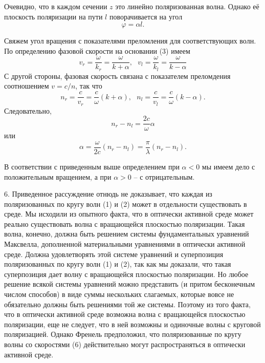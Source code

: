\documentclass[14pt]{article}
\begin{document}
Очевидно, что в каждом сечении $z$ это линейно поляризованная волна. Однако её плоскость поляризации на пути $l$ поворачивается на угол
\begin{equation}
	\varphi = \alpha l.
\end{equation}

Свяжем угол вращения с показателями преломления для соответствующих волн. По определению фазовой скорости на основании (3) имеем
\begin{equation}
	v_r = \frac{\omega}{k_r} = \frac{\omega}{k + \alpha},~~~v_l = \frac{\omega}{k_l} = \frac{\omega}{k - \alpha}
\end{equation}
С другой стороны, фазовая скорость связана с показателем преломдения соотношением $v = c/n$, так что
\begin{equation}
	n_r = \frac{c}{v_r} = \frac{c}{\omega}(k + \alpha),~~~n_l = \frac{c}{v_l} = \frac{c}{\omega}(k - \alpha).
\end{equation}
Следовательно,
\begin{equation}
	n_r - n_l = \frac{2c}{\omega}\alpha
\end{equation}
или
\begin{equation}
	\alpha = \frac{\omega}{2c}(n_r - n_l) = \frac{\pi}{\lambda}(n_r - n_l).
\end{equation}

В соответствии с приведенным выше определением при $\alpha < 0$ мы имеем дело с положительным вращением, а при $\alpha > 0$ -- с отрицательным.

6. Приведенное рассуждение отнюдь не доказывает, что каждая из поляризованных по кругу волн (1) и (2) может в отдельности существовать в среде. Мы исходили из опытного факта, что в оптически активной среде может реально существовать волна с вращающейся плоскостью поляризации. Такая волна, конечно, должна быть решением системы фундаментальных уравнений Максвелла, дополненной материальными уравнениями в оптически активной среде. Должна удовлетворять этой системе уравнений и суперпозиция поляризованных по кругу волн (1) и (2), так как мы доказали, что такая суперпозиция дает волну с вращающейся плоскостью поляризации. Но любое решение всякой системы уравнений можно представить (и притом бесконечным числом способов) в виде суммы нескольких слагаемых, которые вовсе не обязательно должны быть решениями той же системы. Поэтому из того факта, что в оптически активной среде возможна волна с вращающейся плоскостью поляризации, еще не следует, что в ней возможны и одиночные волны с круговой поляризацией. Однако Френель предположил, что поляризованные по кругу волны со скоростями (6) действительно могут распространяться в оптически активной среде.
\end{document}
